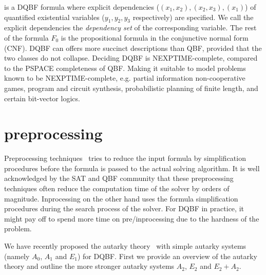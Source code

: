 \documentclass[conference]{IEEEtran}
\begin{document}
is a DQBF formula where explicit dependencies ($(x_1,x_2), (x_2,x_3), (x_1)$) of quantified existential variables ($y_1, y_2, y_3$ respectively) are specified. We call the explicit dependencies the \textit{dependency set} of the corresponding variable. 
%
The rest of the formula $F_0$ is the propositional formula in the conjunctive normal form (CNF).
%
DQBF can offers more succinct descriptions than
QBF, provided that the two classes do not collapse.
%
Deciding DQBF is NEXPTIME-complete, compared to the PSPACE completeness of QBF.
%
Making it suitable to model problems known to be NEXPTIME-complete, e.g. partial information non-cooperative games, program and circuit synthesis, probabilistic planning of finite length, and certain bit-vector logics.

\section{preprocessing}
\label{sec:pre}
Preprocessing techniques~\cite{een2005effective} 
%
tries to reduce the input formula by simplification procedures before the formula is passed to the actual solving algorithm.
%
It is well acknowledged by the SAT and QBF community that these preprocessing techniques often reduce the computation time of the solver by orders of magnitude.
Inprocessing on the other hand uses the formula simplification procedures during the search process of the solver. 
%
For DQBF in practice, it might pay off to spend
more time on pre/inprocessing due to the hardness of the problem.

%

%
We have recently proposed the autarky theory~\cite{oliverfmcad} with simple autarky systems (namely $A_0$, $A_1$ and $E_1$) for DQBF. 
%
First we provide an overview of the autarky theory and outline the more stronger autarky systems $A_2$, $E_2$ and $E_2 + A_2$. 
%
\end{document}
